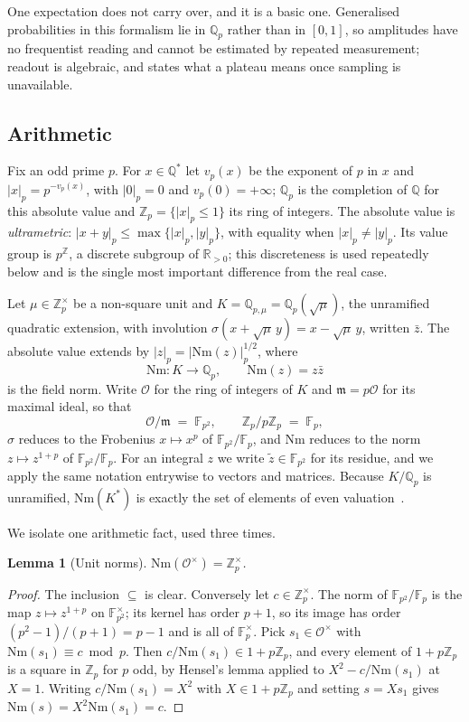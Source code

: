\documentclass{ceurart}
\theoremstyle{plain}
\newtheorem{lemma}[theorem]{Lemma}
\theoremstyle{definition}
\theoremstyle{remark}
\theoremstyle{plain}
\newcommand{\Qp}{\mathbb{Q}_p}
\newcommand{\Zp}{\mathbb{Z}_p}
\newcommand{\Qpmu}{\mathbb{Q}_{p,\mu}}
\newcommand{\padicnorm}[1]{\left|#1\right|_p}
\newcommand{\OK}{\mathcal{O}}
\newcommand{\mm}{\mathfrak{m}}
\newcommand{\FF}{\mathbb{F}}
\newcommand{\Nm}{\mathrm{Nm}}       %
\begin{document}
One expectation does not carry over, and it is a basic one. Generalised
probabilities in this formalism lie in $\Qp$ rather than in $[0,1]$, so
amplitudes have no frequentist reading and
cannot be estimated by repeated measurement; readout is algebraic, and
 states what a plateau means once sampling is unavailable.

\subsection{Arithmetic}

Fix an odd prime $p$. For $x\in\mathbb{Q}^\ast$ let $v_p(x)$ be the exponent of
$p$ in $x$ and $\padicnorm x=p^{-v_p(x)}$, with $\padicnorm 0=0$ and
$v_p(0)=+\infty$; $\Qp$ is the completion of $\mathbb{Q}$ for this absolute
value and $\Zp=\{\padicnorm x\le1\}$ its ring of integers. The absolute value
is \emph{ultrametric}: $\padicnorm{x+y}\le\max\{\padicnorm x,\padicnorm y\}$,
with equality when $\padicnorm x\ne\padicnorm y$. Its value group is $p^{\mathbb{Z}}$,
a discrete subgroup of $\mathbb{R}_{>0}$; this discreteness is used repeatedly
below and is the single most important difference from the real case.

Let $\mu\in\Zp^\times$ be a non-square unit and $K=\Qpmu=\Qp(\sqrt\mu)$, the
unramified quadratic extension, with involution
$\sigma(x+\sqrt\mu\,y)=x-\sqrt\mu\,y$, written $\bar z$. The absolute value
extends by $\padicnorm z=\padicnorm{\Nm(z)}^{1/2}$, where
\[
  \Nm:K\longrightarrow\Qp,\qquad \Nm(z)=z\bar z
\]
is the field norm. Write $\OK$ for the ring of integers of $K$ and $\mm=p\OK$
for its maximal ideal, so that
\[
  \OK/\mm\;=\;\FF_{p^2},\qquad \Zp/p\Zp\;=\;\FF_p ,
\]
$\sigma$ reduces to the Frobenius $x\mapsto x^{p}$ of $\FF_{p^2}/\FF_p$, and
$\Nm$ reduces to the norm $z\mapsto z^{1+p}$ of $\FF_{p^2}/\FF_p$. For an
integral $z$ we write $\widetilde z\in\FF_{p^2}$ for its residue, and we apply
the same notation entrywise to vectors and matrices. Because $K/\Qp$ is
unramified, $\Nm(K^\ast)$ is exactly the set of elements of even
valuation~\cite{Se73}.

We isolate one arithmetic fact, used three times.

\begin{lemma}[Unit norms]
\label{lem:unitnorm}
$\Nm(\OK^\times)=\Zp^\times$.
\end{lemma}

\begin{proof}
The inclusion $\subseteq$ is clear. Conversely let $c\in\Zp^\times$. The norm
of $\FF_{p^2}/\FF_p$ is the map $z\mapsto z^{1+p}$ on $\FF_{p^2}^\times$; its
kernel has order $p+1$, so its image has order $(p^2-1)/(p+1)=p-1$ and is all
of $\FF_p^\times$. Pick $s_1\in\OK^\times$ with $\Nm(s_1)\equiv c\bmod p$. Then
$c/\Nm(s_1)\in1+p\Zp$, and every element of $1+p\Zp$ is a square in $\Zp$ for
$p$ odd, by Hensel's lemma applied to $X^2-c/\Nm(s_1)$ at $X=1$. Writing
$c/\Nm(s_1)=X^2$ with $X\in1+p\Zp$ and setting $s=Xs_1$ gives
$\Nm(s)=X^2\Nm(s_1)=c$.
\end{proof}
\end{document}
